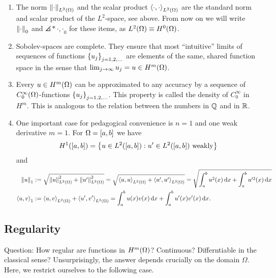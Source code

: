 \begin{remark}
	\begin{enumerate}
		\item The norm \(\norm*{\cdot}_{L^2\parentheses*{\Omega}}\) and the scalar product \(\angles*{\cdot, \cdot}_{L^2\parentheses*{\Omega}}\) are the standard norm and scalar product of the \(L^2\)-space, see above.
		From now on we will write \(\norm*{\cdot}_0\) and \(\angles*{\cdot, \cdot}_0\) for these items, as \(L^2\parentheses*{\Omega} \equiv H^0\parentheses*{\Omega}\).
		\item Sobolev-spaces are complete.
		They ensure that most ``intuitive'' limits of sequences of functions \(\braces*{u_j}_{j = 1, 2, \ldots}\) are elements of the same, shared function space in the sense that \(\lim_{j \to \infty}u_j = u \in H^m\parentheses*{\Omega}\).
		\item Every \(u \in H^m\parentheses*{\Omega}\) can be approximated to any accuracy by a sequence of \(C_0^\infty\parentheses*{\Omega}\)-functions \(\braces*{u_j}_{j = 1, 2, \ldots}\).
		This property is called the density of \(C_0^\infty\) in \(H^m\).
		This is analogous to the relation between the numbers in \(\Q\) and in \(\R\).
		\item One important case for pedagogical convenience is \(n = 1\) and one weak derivative \(m = 1\).
		For \(\Omega = \brackets*{a, b}\) we have
		\[
			H^1\parentheses*{\brackets*{a, b}} = \braces*{u \in L^2\parentheses*{\brackets*{a, b}} : u' \in L^2\parentheses*{\brackets*{a, b}}\text{ weakly}}
		\]
		and
		\begin{align*}
			\norm*{u}_1 &:= \sqrt{\norm*{u}_{L^2\parentheses*{\Omega}}^2 + \norm*{u'}_{L^2\parentheses*{\Omega}}^2} = \sqrt{\angles*{u, u}_{L^2\parentheses*{\Omega}} + \angles*{u', u'}_{L^2\parentheses*{\Omega}}} = \sqrt{\int_a^b u^2\parentheses*{x}\d x + \int_a^b u'^2\parentheses*{x}\d x}\\
			\angles*{u, v}_1 &:= \angles*{u, v}_{L^2\parentheses*{\Omega}} + \angles*{u', v'}_{L^2\parentheses*{\Omega}} = \int_a^b u\parentheses*{x}v\parentheses*{x}\d x + \int_a^b u'\parentheses*{x}v'\parentheses*{x}\d x.
		\end{align*}
	\end{enumerate}
\end{remark}


\subsection{Regularity}

Question: How regular are functions in \(H^m\parentheses*{\Omega}\)?
Continuous?
Differntiable in the classical sense?
Unsurprisingly, the answer depends crucially on the domain \(\Omega\).
Here, we restrict ourselves to the following case.


